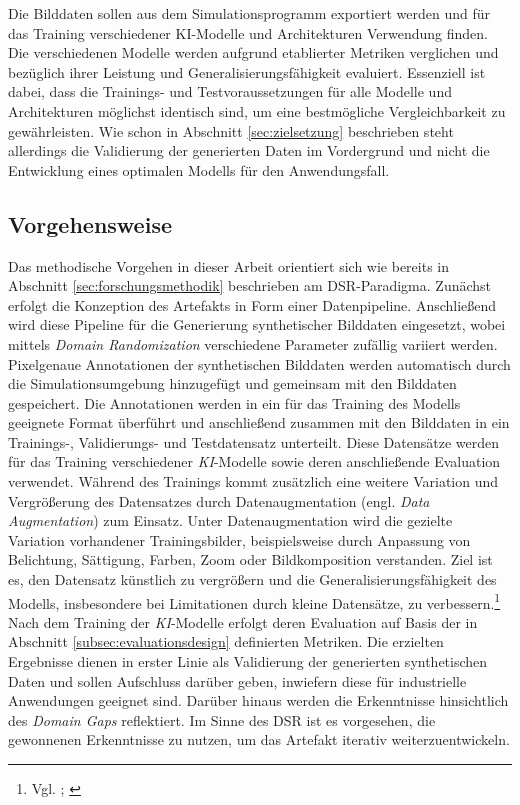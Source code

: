 Die Bilddaten sollen aus dem Simulationsprogramm exportiert werden und für das Training verschiedener \ac{KI}-Modelle und Architekturen Verwendung finden. Die verschiedenen Modelle werden aufgrund etablierter Metriken verglichen und bezüglich ihrer Leistung und Generalisierungsfähigkeit evaluiert. Essenziell ist dabei, dass die Trainings- und Testvoraussetzungen für alle Modelle und Architekturen möglichst identisch sind, um eine bestmögliche Vergleichbarkeit zu gewährleisten. Wie schon in Abschnitt \ref{sec:zielsetzung} beschrieben steht allerdings die Validierung der generierten Daten im Vordergrund und nicht die Entwicklung eines optimalen Modells für den Anwendungsfall.


\subsection{Vorgehensweise}
Das methodische Vorgehen in dieser Arbeit orientiert sich wie bereits in Abschnitt \ref{sec:forschungsmethodik} beschrieben am \ac{DSR}-Paradigma. Zunächst erfolgt die Konzeption des Artefakts in Form einer Datenpipeline. Anschließend wird diese Pipeline für die Generierung synthetischer Bilddaten eingesetzt, wobei mittels \textit{Domain Randomization} verschiedene Parameter zufällig variiert werden. Pixelgenaue Annotationen der synthetischen Bilddaten werden automatisch durch die Simulationsumgebung hinzugefügt und gemeinsam mit den Bilddaten gespeichert. Die Annotationen werden in ein für das Training des Modells geeignete Format überführt und anschließend zusammen mit den Bilddaten in ein Trainings-, Validierungs- und Testdatensatz unterteilt. Diese Datensätze werden für das Training verschiedener \textit{KI}-Modelle sowie deren anschließende Evaluation verwendet. Während des Trainings kommt zusätzlich eine weitere Variation und Vergrößerung des Datensatzes durch Datenaugmentation (engl. \textit{Data Augmentation}) zum Einsatz. Unter Datenaugmentation wird die gezielte Variation vorhandener Trainingsbilder, beispielsweise durch Anpassung von Belichtung, Sättigung, Farben, Zoom oder Bildkomposition verstanden. Ziel ist es, den Datensatz künstlich zu vergrößern und die Generalisierungsfähigkeit des Modells, insbesondere bei Limitationen durch kleine Datensätze, zu verbessern.\footnote{Vgl. \cite[S. 2 f.]{shorten_survey_2019}; \cite{ultralytics_yolo-datenerweiterung_nodate}} Nach dem Training der \textit{KI}-Modelle erfolgt deren Evaluation auf Basis der in Abschnitt \ref{subsec:evaluationsdesign} definierten Metriken. Die erzielten Ergebnisse dienen in erster Linie als Validierung der generierten synthetischen Daten und sollen Aufschluss darüber geben, inwiefern diese für industrielle Anwendungen geeignet sind. Darüber hinaus werden die Erkenntnisse hinsichtlich des \textit{Domain Gaps} reflektiert. Im Sinne des \ac{DSR} ist es vorgesehen, die gewonnenen Erkenntnisse zu nutzen, um das Artefakt iterativ weiterzuentwickeln.

